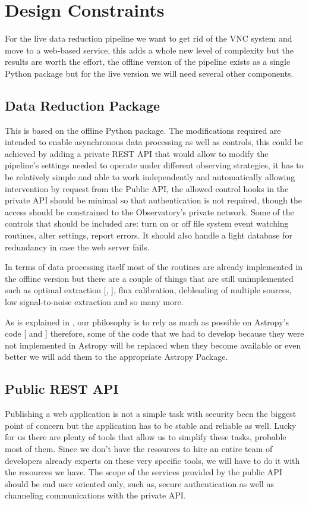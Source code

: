 \documentclass[11pt,twoside]{article}
\begin{document}
\section{Design Constraints}

For the live data reduction pipeline we want to get rid of the VNC system and move to a web-based service, this adds a whole new level of complexity but the results are worth the effort, the offline version of the pipeline exists as a single Python package but for the live version  we will need several other components.

\subsection{Data Reduction Package}

This is based on the offline Python package. The modifications required are intended to enable asynchronous data processing as well as controls, this could be achieved by adding a private REST API that would allow to modify the pipeline's settings needed to operate under different observing strategies, it has to be relatively simple and able to work independently and automatically allowing intervention by request from the Public API, the allowed control hooks in the private API should be minimal so that authentication is not required, though the access should be constrained to the Observatory's private network. Some of the controls that should be included are: turn on or off file system event watching routines, alter settings, report errors. It should also handle a light database for redundancy in case the web server fails.

In terms of data processing itself most of the routines are already implemented in the offline version but there are a couple of things that are still unimplemented such as optimal extraction [\citet{1989PASP..101.1032M},  \citet{1986PASP...98..609H}], flux calibration, deblending of multiple sources, low signal-to-noise extraction and so many more.

As is explained in \citet{P9-115_adassxxvii}, our philosophy is to rely as much as possible on Astropy's code   [\citet{2013A&A...558A..33A} and \citet{2018AJ....156..123A}] therefore, some of the code that we had to develop because they were not implemented in Astropy will be replaced when they become available or even better we will add them to the appropriate Astropy Package.

\subsection{Public REST API}
Publishing a web application is not a simple task with security been the biggest point of concern but the application has to be stable and reliable as well. Lucky for us there are plenty of tools that allow us to simplify these tasks, probable most of them. Since we don't have the resources to hire an entire team of developers already experts on these very specific tools, we will have to do it with the resources we have. The scope of the services provided by the public API should be end user oriented only, such as, secure authentication as well as channeling communications with the private API.
\end{document}
